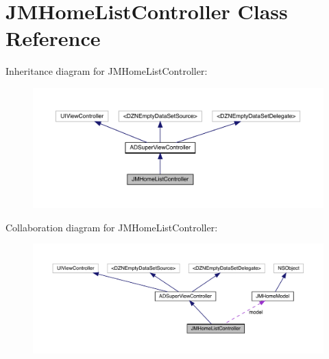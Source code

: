 \hypertarget{interface_j_m_home_list_controller}{}\section{J\+M\+Home\+List\+Controller Class Reference}
\label{interface_j_m_home_list_controller}


Inheritance diagram for J\+M\+Home\+List\+Controller\+:\nopagebreak
\begin{figure}[H]
\begin{center}
\leavevmode
\includegraphics[width=350pt]{interface_j_m_home_list_controller__inherit__graph}
\end{center}
\end{figure}


Collaboration diagram for J\+M\+Home\+List\+Controller\+:\nopagebreak
\begin{figure}[H]
\begin{center}
\leavevmode
\includegraphics[width=350pt]{interface_j_m_home_list_controller__coll__graph}
\end{center}
\end{figure}

